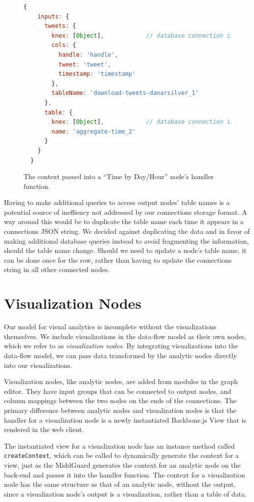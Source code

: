 \documentclass[midd]{thesis}
\begin{document}
\begin{figure}
  \begin{lstlisting}[language=javascript, gobble=2]
  {
    inputs: {
      tweets: {
        knex: [Object],            // database connection instance
        cols: {
          handle: 'handle',
          tweet: 'tweet',
          timestamp: 'timestamp'
        },
        tableName: 'download-tweets-danarsilver_1'
      },
      table: {
        knex: [Object],            // database connection instance
        name: 'aggregate-time_2'
      }
    }
  }
  \end{lstlisting}
  \caption{The context passed into a ``Time by Day/Hour'' node's handler
  function.}
  \label{lst:nodecontext}
\end{figure}

Having to make additional queries to access output nodes' table names is a
potential source of ineffiency not addressed by our connections storage format.
A way around this would be to duplicate the table name each time it appears in a
connections JSON string. We decided against duplicating the data and in favor of
making additional database queries instead to avoid fragmenting the information,
should the table name change. Should we need to update a node's table name, it
can be done once for the row, rather than having to update the connections
string in all other connected nodes.

\section{Visualization Nodes}

Our model for visual analytics is incomplete without the visualizations
themselves. We include visualizations in the data-flow model as their own nodes,
which we refer to as \textit{visualization nodes}. By integrating visualizations
into the data-flow model, we can pass data transformed by the analytic nodes
directly into our visualizations.

Visualization nodes, like analytic nodes, are added from modules in the graph
editor. They have input groups that can be connected to output nodes, and column
mappings between the two nodes on the ends of the connections. The primary
difference between analytic nodes and visualization nodes is that the handler
for a visualization node is a newly instantiated Backbone.js View
\cite{backbone} that is rendered in the web client.

The instantiated view for a visualization node has an instance method called\\
\texttt{createContext}, which can be called to dynamically generate the context
for a view, just as the MiddGuard generates the context for an analytic node on
the back-end and passes it into the handler function. The context for a
visualization node has the same structure as that of an analytic node, without
the output, since a visualization node's output is a visualization, rather than
a table of data.
\end{document}
